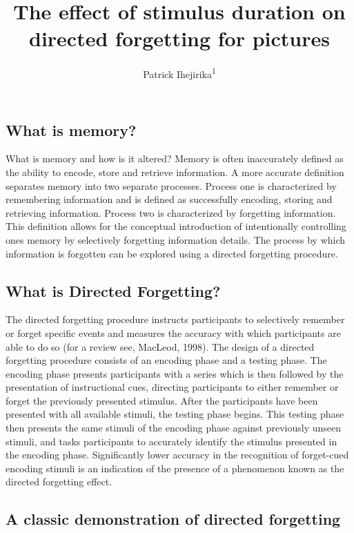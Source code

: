 \documentclass[
  man,floatsintext]{apa6}
\title{The effect of stimulus duration on directed forgetting for pictures}
\author{Patrick Ihejirika\textsuperscript{1}}
\date{}
\affiliation{\vspace{0.5cm}\textsuperscript{1} Brooklyn College of CUNY}
\begin{document}
\maketitle

\hypertarget{what-is-memory}{%
\subsection{What is memory?}\label{what-is-memory}}

What is memory and how is it altered? Memory is often inaccurately defined as the ability to encode, store and retrieve information. A more accurate definition separates memory into two separate processes. Process one is characterized by remembering information and is defined as successfully encoding, storing and retrieving information. Process two is characterized by forgetting information. This definition allows for the conceptual introduction of intentionally controlling ones memory by selectively forgetting information details. The process by which information is forgotten can be explored using a directed forgetting procedure.

\hypertarget{what-is-directed-forgetting}{%
\subsection{What is Directed Forgetting?}\label{what-is-directed-forgetting}}

The directed forgetting procedure instructs participants to selectively remember or forget specific events and measures the accuracy with which participants are able to do so (for a review see, MacLeod, 1998). The design of a directed forgetting procedure consists of an encoding phase and a testing phase. The encoding phase presents participants with a series which is then followed by the presentation of instructional cues, directing participants to either remember or forget the previously presented stimulus. After the participants have been presented with all available stimuli, the testing phase begins. This testing phase then presents the same stimuli of the encoding phase against previously unseen stimuli, and tasks participants to accurately identify the stimulus presented in the encoding phase. Significantly lower accuracy in the recognition of forget-cued encoding stimuli is an indication of the presence of a phenomenon known as the directed forgetting effect.

\hypertarget{a-classic-demonstration-of-directed-forgetting}{%
\subsection{A classic demonstration of directed forgetting}\label{a-classic-demonstration-of-directed-forgetting}}
\end{document}

